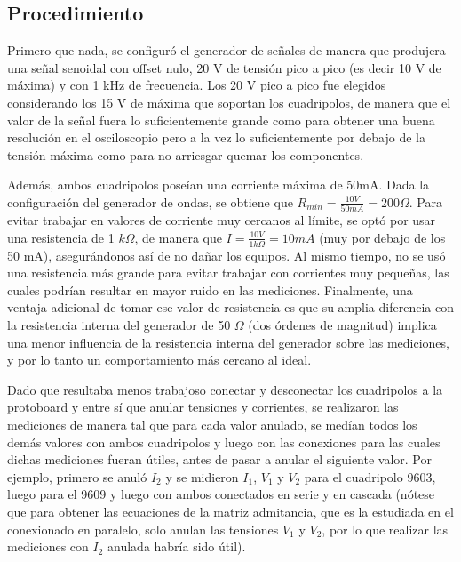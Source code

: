     \graphicspath{{imagenesFiguras/}} %

    \subsection{Procedimiento}
    
    Primero que nada, se configuró el generador de señales de manera que produjera una señal senoidal con offset nulo, 20 V de tensión
    pico a pico (es decir 10 V de máxima) y con 1 kHz de frecuencia. Los 20 V pico a pico fue elegidos considerando los 15 V de máxima
    que soportan los cuadripolos, de manera que el valor de la señal fuera lo suficientemente grande como para obtener una buena 
    resolución en el osciloscopio pero a la vez lo suficientemente por debajo de la tensión máxima como para no arriesgar quemar los
    componentes. 
    
    
    Además, ambos cuadripolos poseían una corriente máxima de 50mA. Dada la configuración del generador de ondas, se obtiene que  
    $R_{min} = \frac{10 V}{50 mA} = 200 \Omega$. Para evitar trabajar en valores de corriente muy cercanos al límite, se optó por
    usar una resistencia de 1 $k\Omega$, de manera que $ I = \frac{10 V}{1 k\Omega} = 10 mA $ (muy por debajo de los 50 mA), 
    asegurándonos así de no dañar los equipos. Al mismo tiempo, no se usó una resistencia más grande para evitar trabajar con
    corrientes muy pequeñas, las cuales podrían resultar en mayor ruido en las mediciones. Finalmente, una ventaja adicional de tomar
    ese valor de resistencia es que su amplia diferencia con la resistencia interna del generador de 50 $ \Omega $ (dos órdenes de
    magnitud) implica una menor influencia de la resistencia interna del generador sobre las mediciones, y por lo tanto un comportamiento
    más cercano al ideal.

    \par Dado que resultaba menos trabajoso conectar y desconectar los cuadripolos a la protoboard y entre sí que anular tensiones y
    corrientes, se realizaron las mediciones de manera tal que para cada valor anulado, se medían todos los demás valores con ambos
    cuadripolos y luego con las conexiones para las cuales dichas mediciones fueran útiles, antes de pasar a anular el siguiente valor.
    Por ejemplo, primero se anuló $ I_2 $ y se midieron $ I_1 $, $ V_1 $ y $ V_2 $ para el cuadripolo 9603, luego 
    para el 9609 y luego con ambos conectados en serie y en cascada (nótese que para obtener las ecuaciones de la matriz admitancia, 
    que es la estudiada en el conexionado en paralelo, solo anulan las tensiones $ V_1 $ y $ V_2 $, por lo que realizar las mediciones
    con $ I_2 $ anulada habría sido útil).

